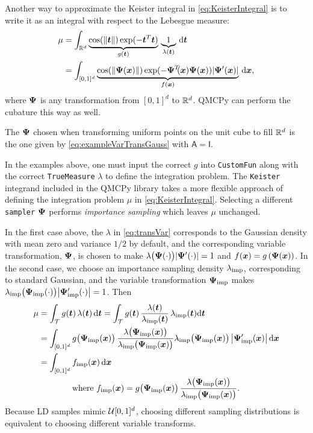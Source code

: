 \documentclass[graybox,footinfo]{svmult}
\newcommand{\QMCPYabs}[1]{\ensuremath{{\left \lvert #1 \right \rvert}}}
\newcommand{\IMP}{\textup{imp}}
\newcommand{\mA}{\mathsf{A}}
\newcommand{\mI}{\mathsf{I}}
\newcommand{\cube}{[0,1]^d}
\begin{document}
Another way to approximate the Keister integral in \eqref{eq:KeisterIntegral} is to write it as an integral with respect to the Lebesgue measure:
\begin{align*} 
	\mu 
	& = \int_{\bbR^d} \underbrace{\cos(\lVert \bst \rVert) \exp(-\bst^T \bst) }_{g(\bst)} \, \underbrace{1}_{\lambda(\bst)} \,\D \bst \\
	& = \int_{[0,1]^d} \underbrace{\cos(\lVert \bsPsi(\bsx) \rVert) \exp(-\bsPsi^T\!\!(\bsx) \bsPsi(\bsx)) \QMCPYabs{\bsPsi'(\bsx)}  }_{f(\bsx)} \, \D \bsx,
\end{align*}
where ${\boldsymbol{\Psi}}$ is any transformation from $[0,1]^d$ to ${\mathbb{R}}^d$.  QMCPy can perform the cubature this way as well.

The ${\boldsymbol{\Psi}}$ chosen when transforming uniform points on the unit cube to fill ${\mathbb{R}}^d$ is the one given by \eqref{eq:exampleVarTransGauss} with $\mA = \mI$.

In the examples above, one must input the correct $g$ into \texttt{CustomFun} along with the correct \texttt{TrueMeasure} $\lambda$ to define the integration problem. The \texttt{Keister} integrand included in the QMCPy library takes a more flexible approach of defining the integration problem $\mu$ in \eqref{eq:KeisterIntegral}. Selecting a different \texttt{sampler} ${\boldsymbol{\Psi}}$ performs  \emph{importance sampling} which leaves $\mu$ unchanged.  


In the first case above, the $\lambda$ in \eqref{eq:transVar} corresponds to the Gaussian density  with mean zero and variance $1/2$ by default, and the corresponding variable transformation, ${\boldsymbol{\Psi}}$, is chosen to make $\lambda\bigl(\bsPsi(\cdot)\bigr) \QMCPYabs{\bsPsi'(\cdot)}  = 1$ and $f({\boldsymbol{x}}) = g\left({\boldsymbol{\Psi}}({\boldsymbol{x}}) \right)$.  In the second case,  we choose an importance sampling density $\lambda_{\IMP}$, corresponding  to standard  Gaussian, and the variable transformation $\bsPsi_{\IMP}$ makes $\lambda_\IMP\bigl(\bsPsi_{\IMP}(\cdot)\bigr) \QMCPYabs{\bsPsi'_{\IMP}(\cdot)}  = 1$.  Then
\begin{align}
	\nonumber 
	\mu &= \int_\calT g(\bst) \, \lambda(\bst) \, \D \bst  = \int_\calT g(\bst) \, \frac{\lambda(\bst)}{\lambda_\IMP(\bst) } \, \lambda_\IMP(\bst) \D \bst  \\ 
	\nonumber
	& =  \int_{\cube} g\bigl(\bsPsi_\IMP(\bsx)\bigr) \, \frac{\lambda\bigl(\bsPsi_\IMP(\bsx)\bigr)} {\lambda_\IMP\bigl(\bsPsi_\IMP(\bsx)\bigr) } \lambda_\IMP\bigl(\bsPsi_\IMP(\bsx)\bigr) \,\QMCPYabs{\bsPsi'_{\IMP}(\bsx)}  \, \D \bsx \\
	\nonumber
	& =  \int_{\cube} f_\IMP(\bsx) \, \D \bsx  \\
	\label{eq:transVarImp}
	& \qquad \qquad \text{where } f_\IMP(\bsx)  = g\bigl(\bsPsi_\IMP(\bsx)\bigr)  \,  \frac{\lambda\bigl(\bsPsi_\IMP(\bsx)\bigr)} {\lambda_\IMP\bigl(\bsPsi_\IMP(\bsx)\bigr) }.
\end{align}
Because LD samples mimic $\calU\cube$, choosing different sampling distributions is equivalent to choosing different variable transforms.
\end{document}
